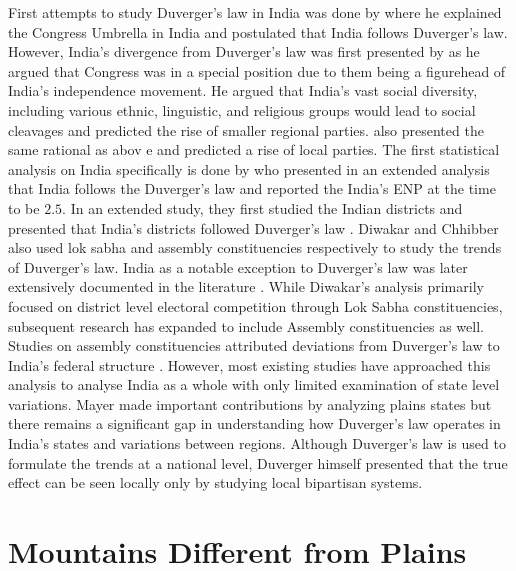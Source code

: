 First attempts to study Duverger's law in India was done by \cite{riker1982two,riker1976number} where he explained the Congress Umbrella in India and postulated that India follows Duverger's law. However, India's divergence from Duverger's law was first presented by \cite{lijphart1994} as he argued that Congress was in a special position due to them being a figurehead of India's independence movement. He argued that India's vast social diversity, including various ethnic, linguistic, and religious groups would lead to social cleavages and predicted the rise of smaller regional parties. \cite{taagepera1989seats,sridharan1997duverger} also presented the same rational as abov   e and predicted a rise of local parties. The first statistical analysis on India specifically is done by \cite{chhibber1998party} who presented in an extended analysis that India follows the Duverger's law and reported the India's ENP at the time to be $2.5$. In an extended study, they first studied the Indian districts and presented that India's districts followed Duverger's law \citep{chhibber2009formation}. Diwakar and Chhibber also used lok sabha and assembly constituencies respectively to study the trends of Duverger’s law. 
India as a notable exception to Duverger's law was later extensively documented in the literature \citep{diwakar2007duverger, diwakar2010party, mayer2013gross,carneggie_duverger}. While Diwakar's analysis primarily focused on district level electoral competition through Lok Sabha constituencies, subsequent research has expanded to include Assembly constituencies as well. Studies on assembly constituencies attributed deviations from Duverger's law to India's federal structure \citep{chhibber2006duvergerian}. However, most existing studies have approached this analysis to analyse India as a whole with only limited examination of state level variations. Mayer made important contributions by analyzing plains states but there remains a significant gap in understanding how Duverger's law operates in India's states and variations between regions. Although Duverger’s law is used to formulate the trends at a national level, Duverger himself presented that the true effect can be seen locally only by studying local bipartisan systems. 

\section{Mountains Different from Plains}
